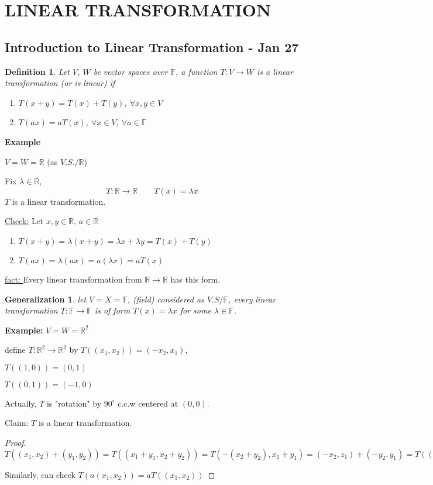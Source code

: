 \documentclass[12pt]{article}
\theoremstyle{plain}
\newtheorem{definition}{Definition}[subsection]
\newtheorem{generalization}{Generalization}[subsection]
\newcommand{\mR}{{\mathbb{R}}}
\newcommand{\mF}{{\mathbb{F}}}
\begin{document}
	\newpage
	\section{LINEAR TRANSFORMATION}
	\subsection{Introduction to Linear Transformation - Jan 27}
	\begin{definition}
		Let $V$, $W$ be vector spaces over $\mF$, a function $T:V\to W$
		is a linear transformation (or is linear) if 
		\begin{enumerate}
			\item $T(x+y) = T(x) + T(y)$, $\forall x, y \in V$
			\item $T(ax) = aT(x)$, $\forall x\in V$, $\forall a \in \mF$\\
		\end{enumerate}
	\end{definition}

	{\color{Brown}
		\textbf{Example }

		$V=W=\mR$ (as $V.S. / \mR$) 
	
		Fix $\lambda \in \mR$, 
		\[
			T:\mR \to \mR \qquad T(x) = \lambda x
		\]
		$T$ is a linear transformation. 

		\underline{Check:} Let $x, y \in \mR$, $a \in \mR$
		\begin{enumerate}
			\item $T(x+y) = \lambda (x+y) = \lambda x+\lambda y =T(x) + T(y)$
			\item $T(ax) = \lambda (ax) = a(\lambda x) = aT(x)$
		\end{enumerate}
	}
	\underline{fact: }Every linear transformation from $\mR \to \mR$ 
	has this form. \\

	\begin{generalization}
	let $V = X = \mF$, (field) considered as 
	$V.S / \mF$, every linear transformation $T:\mF \to \mF$ 
	is of form $T(x) = \lambda x$ for some $\lambda \in \mF$. \\
	\end{generalization}
	

	{\color{Brown}
	\textbf{Example: }
	$V = W = \mR^2$
	
	define $T : \mR^2 \to \mR^2$ by $T((x_1, x_2)) = (-x_2 , x_1)$,

	$T((1,0)) = (0,1)$

	$T((0,1)) = (-1,0)$ 

	Actually, $T$ is "rotation" by $90^{\circ}$
	c.c.w centered at $(0,0)$.

	Claim: $T$ is a linear transformation.

	\begin{proof}
		$T((x_1,x_2)+(y_1, y_2)) = T((x_1+y_1, x_2+y_2)) = T(-(x_2+y_2),
		x_1+y_1) = (-x_2,z_1)+(-y_2,y_1) = T((x_1,x_2)) + T((y_1,y_2))$

		Similarly, can check $T(a(x_1,x_2)) = aT((x_1,x_2))$
	\end{proof}

	}
\end{document}
